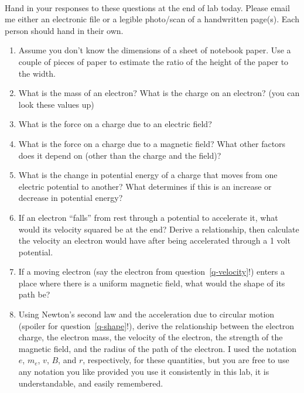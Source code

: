 \documentclass{tufte-handout}
\begin{document}



\vspace{0.5cm}
\\
\vspace{0.5cm}

Hand in your responses to these questions at the end of lab today.  Please email me either an electronic file or a legible photo/scan of a handwritten page(s).  Each person should hand in their own.

\begin{enumerate}

\item Assume you don't know the dimensions of a sheet of notebook paper. Use a couple of pieces of paper to estimate
the ratio of the height of the paper to the width.

\item What is the mass of an electron? What is the charge on an electron? (you can look these values up)

\item What is the force on a charge due to an electric field?

\item What is the force on a charge due to a magnetic field?  What other factors does it depend on (other than the charge and the field)?

\item What is the change in potential energy of a charge that moves from one electric potential to another?  What determines if this is an increase or decrease in potential energy?

\item \label{q-velocity} If an electron ``falls'' from rest through a potential to accelerate it, what would its velocity squared be at the end? Derive a relationship, then calculate the velocity an electron would have after
being accelerated through a 1 volt potential. 

\item \label{q-shape} If a moving electron (say the electron from question~\ref{q-velocity}!) enters a place where there is a uniform magnetic field, what would the shape of its path be?

\item \label{q-newton} Using Newton's second law and the acceleration due to circular motion (spoiler for question~\ref{q-shape}!), derive the relationship between the electron charge, the electron mass, the velocity of the electron, the strength of the magnetic field, and the radius of the path of the electron.  I used the notation $e$, $m_e$, $v$, $B$, and $r$, respectively, for these quantities, but you are free to use any notation you like provided you use it consistently in this lab, it is understandable, and easily remembered.  


\end{enumerate}
\end{document}
